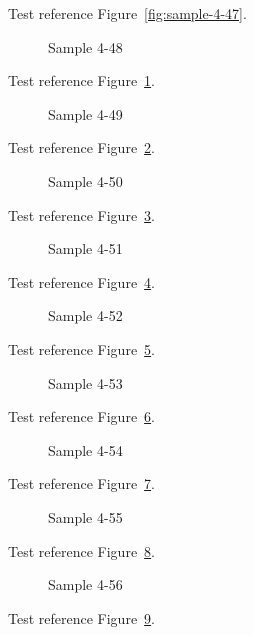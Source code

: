 Test reference Figure~\ref{fig:sample-4-47}.

\begin{figure}[tbhp]
\caption{Sample 4-48}
\label{fig:sample-4-48}
\end{figure}

Test reference Figure~\ref{fig:sample-4-48}.

\begin{figure}[tbhp]
\caption{Sample 4-49}
\label{fig:sample-4-49}
\end{figure}

Test reference Figure~\ref{fig:sample-4-49}.

\begin{figure}[tbhp]
\caption{Sample 4-50}
\label{fig:sample-4-50}
\end{figure}

Test reference Figure~\ref{fig:sample-4-50}.

\begin{figure}[tbhp]
\caption{Sample 4-51}
\label{fig:sample-4-51}
\end{figure}

Test reference Figure~\ref{fig:sample-4-51}.

\begin{figure}[tbhp]
\caption{Sample 4-52}
\label{fig:sample-4-52}
\end{figure}

Test reference Figure~\ref{fig:sample-4-52}.

\begin{figure}[tbhp]
\caption{Sample 4-53}
\label{fig:sample-4-53}
\end{figure}

Test reference Figure~\ref{fig:sample-4-53}.

\begin{figure}[tbhp]
\caption{Sample 4-54}
\label{fig:sample-4-54}
\end{figure}

Test reference Figure~\ref{fig:sample-4-54}.

\begin{figure}[tbhp]
\caption{Sample 4-55}
\label{fig:sample-4-55}
\end{figure}

Test reference Figure~\ref{fig:sample-4-55}.

\begin{figure}[tbhp]
\caption{Sample 4-56}
\label{fig:sample-4-56}
\end{figure}

Test reference Figure~\ref{fig:sample-4-56}.

